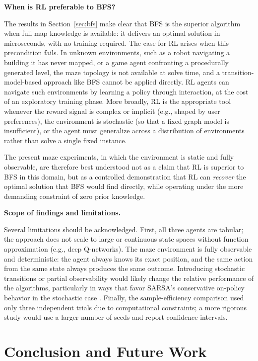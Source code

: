 \documentclass[11pt]{article}
\begin{document}
\textbf{When is RL preferable to BFS?}

The results in Section~\ref{sec:bfs} make clear that BFS is the superior
algorithm when full map knowledge is available: it delivers an optimal
solution in microseconds, with no training required. The case for RL
arises when this precondition fails. In unknown environments, such as a
robot navigating a building it has never mapped, or a game agent
confronting a procedurally generated level, the maze topology is not
available at solve time, and a transition-model-based approach like BFS
cannot be applied directly. RL agents can navigate such environments by
learning a policy through interaction, at the cost of an exploratory
training phase. More broadly, RL is the appropriate tool whenever the
reward signal is complex or implicit (e.g., shaped by user preferences),
the environment is stochastic (so that a fixed graph model is insufficient),
or the agent must generalize across a distribution of environments rather
than solve a single fixed instance.

The present maze experiments, in which the environment is static and fully
observable, are therefore best understood not as a claim that RL is
superior to BFS in this domain, but as a controlled demonstration that RL
can \emph{recover} the optimal solution that BFS would find directly,
while operating under the more demanding constraint of zero prior
knowledge.

\textbf{Scope of findings and limitations.}

Several limitations should be acknowledged. First, all three agents are
tabular; the approach does not scale to large or continuous state spaces
without function approximation (e.g., deep Q-networks). The maze
environment is fully observable and deterministic: the agent always knows
its exact position, and the same action from the same state always
produces the same outcome. Introducing stochastic transitions or partial
observability would likely change the relative performance of the
algorithms, particularly in ways that favor SARSA's conservative
on-policy behavior in the stochastic case \cite{singh2000}. Finally, the
sample-efficiency comparison used only three independent trials due to
computational constraints; a more rigorous study would use a larger number
of seeds and report confidence intervals.

\section{Conclusion and Future Work}
\end{document}
